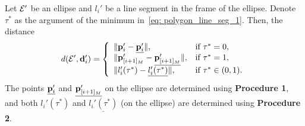 \begin{proposition}
    Let ${\cal E}'$ be an ellipse and $l_i'$ be a line segment in the frame of the ellipse. Denote $\tau^*$ as the argument of the minimum in~\eqref{eq: polygon_line_seg_1}. Then, the distance
    \begin{equation}
        d({\cal E}', \mathbf{d}_i') = 
        \left\{
            \begin{array}{ll}
            \| \mathbf{p}_i' - \underline{\mathbf{p}_i'} \|,     &  \text{if } \tau^* = 0, \\
            \| \mathbf{p}_{[i+1]_{M}}' - \underline{\mathbf{p}_{[i+1]_{M}}'} \|,      & \text{if } \tau^* = 1,  \\
            \| l_i'(\tau^*) - \underline{l_i'(\tau^*)} \|,    & \text{if } \tau^* \in (0,1).
            \end{array}
        \right.
    \end{equation}
The points $\underline{\mathbf{p}_i'}$ and $\underline{\mathbf{p}_{[i+1]_{M}}'}$ on the ellipse are determined using \textbf{Procedure 1}, and both $l_i'(\tau^*)$ and $\underline{l_i'(\tau^*)}$ (on the ellipse) are determined using \textbf{Procedure 2}.
\label{prop: distance}
\end{proposition}


